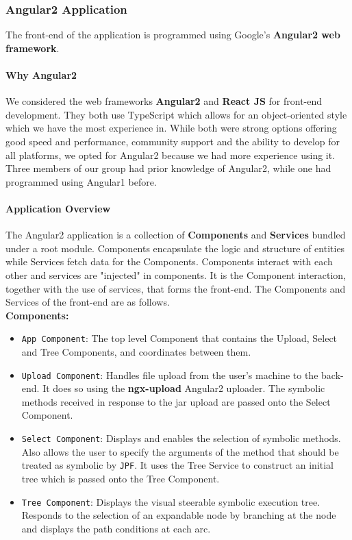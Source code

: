\documentclass[titlepage,11pt]{article}
\begin{document}
\subsubsection{Angular2 Application}
The front-end of the application is programmed using Google's \textbf{Angular2 web framework}\cite{angular}. 

\paragraph{Why Angular2}
We considered the web frameworks \textbf{Angular2} and \textbf{React JS} for front-end development. They both use TypeScript\cite{typescript} which allows for an object-oriented style which we have the most experience in. While both were strong options offering good speed and performance, community support and the ability to develop for all platforms, we opted for Angular2 because we had more experience using it.
Three members of our group had prior knowledge of Angular2, while one had programmed using Angular1 before.  \\

\paragraph{Application Overview}

The Angular2 application is a collection of \textbf{Components} and \textbf{Services} bundled under a root module. Components encapsulate the logic and structure of entities while Services fetch data for the Components. Components interact with each other and services are "injected" in components. It is the Component interaction, together with the use of services, that forms the front-end. The Components and Services of the front-end are as follows. \\

\textbf{Components:} 
\begin{itemize}
\item \texttt{App Component}: The top level Component that contains the Upload, Select and Tree Components, and coordinates between them.
\item \texttt{Upload Component}: Handles file upload from the user's machine to the back-end. It does so using the \textbf{ngx-upload}\cite{uploader} Angular2 uploader. The symbolic methods received in response to the jar upload are passed onto the Select Component.
\item \texttt{Select Component}: Displays and enables the selection of symbolic methods. Also allows the user to specify the arguments of the method that should be treated as symbolic by \texttt{JPF}. It uses the Tree Service to construct an initial tree which is passed onto the Tree Component.
\item \texttt{Tree Component}: Displays the visual steerable symbolic execution tree. Responds to the selection of an expandable node by branching at the node and displays the path conditions at each arc.
\end{itemize}
\end{document}
